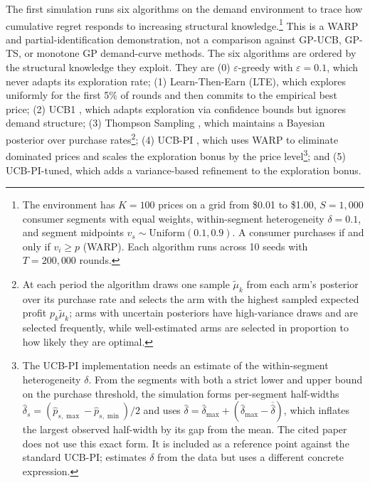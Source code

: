 The first simulation runs six algorithms on the \citet{Misra2019} demand environment to trace how cumulative regret responds to increasing structural knowledge.\footnote{The environment has $K = 100$ prices on a grid from \$0.01 to \$1.00, $S = 1{,}000$ consumer segments with equal weights, within-segment heterogeneity $\delta = 0.1$, and segment midpoints $v_s \sim \mathrm{Uniform}(0.1, 0.9)$. A consumer purchases if and only if $v_i \geq p$ (WARP). Each algorithm runs across 10 seeds with $T = 200{,}000$ rounds.} This is a WARP and partial-identification demonstration, not a comparison against GP-UCB, GP-TS, or monotone GP demand-curve methods. The six algorithms are ordered by the structural knowledge they exploit. They are (0) $\varepsilon$-greedy with $\varepsilon = 0.1$, which never adapts its exploration rate; (1) Learn-Then-Earn (LTE), which explores uniformly for the first 5\% of rounds and then commits to the empirical best price; (2) UCB1 \citep{auer2002}, which adapts exploration via confidence bounds but ignores demand structure; (3) Thompson Sampling \citep{Thompson1933}, which maintains a Bayesian posterior over purchase rates\footnote{At each period the algorithm draws one sample $\tilde{\mu}_k$ from each arm's posterior over its purchase rate and selects the arm with the highest sampled expected profit $p_k \tilde{\mu}_k$; arms with uncertain posteriors have high-variance draws and are selected frequently, while well-estimated arms are selected in proportion to how likely they are optimal.}; (4) UCB-PI \citep{Misra2019}, which uses WARP to eliminate dominated prices and scales the exploration bonus by the price level\footnote{The UCB-PI implementation needs an estimate of the within-segment heterogeneity $\delta$. From the segments with both a strict lower and upper bound on the purchase threshold, the simulation forms per-segment half-widths $\hat{\delta}_s = (\hat{p}_{s,\max} - \hat{p}_{s,\min})/2$ and uses $\hat{\delta} = \hat{\delta}_{\max} + (\hat{\delta}_{\max} - \overline{\hat{\delta}})$, which inflates the largest observed half-width by its gap from the mean. The cited paper does not use this exact form. It is included as a reference point against the standard UCB-PI; \citet{Misra2019} estimates $\delta$ from the data but uses a different concrete expression.}; and (5) UCB-PI-tuned, which adds a variance-based refinement to the exploration bonus.

